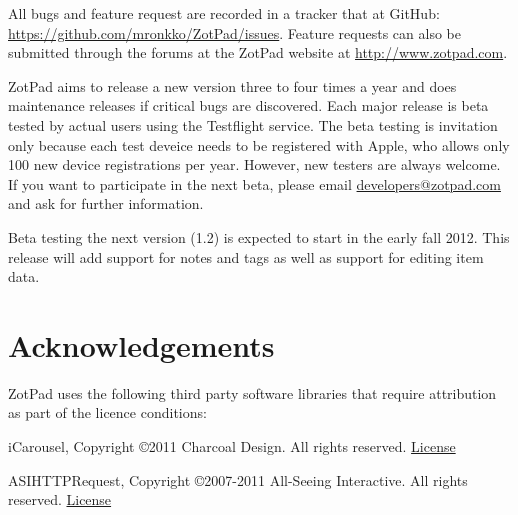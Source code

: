 \documentclass[oneside, openany, 12pt]{tufte-book}
\newcommand{\ipad}[1]{}
\newcommand{\ipad}[1]{#1}
\begin{document}
All bugs and feature request are recorded in a tracker that at GitHub: \url{https://github.com/mronkko/ZotPad/issues}. Feature requests can also be submitted through the forums at the ZotPad website at \url{http://www.zotpad.com}. 

ZotPad aims to release a new version three to four times a year and does maintenance releases if critical bugs are discovered. Each major release is beta tested by actual users using the Testflight service. The beta testing is invitation only because each test deveice needs to be registered with Apple, who allows only 100 new device registrations per year. However, new testers are always welcome. If you want to participate in the next beta, please email \href{mailto:developers@zotpad.com}{developers@zotpad.com} and ask for further information.

Beta testing the next version (1.2) is expected to start in the early fall 2012. This release will add support for notes and tags as well as support for editing item data. 

\chapter{Acknowledgements}

\ipad{\begin{fullwidth}}

\setlength{\parindent}{0pt}

\setlength{\parskip}{\baselineskip}

ZotPad uses the following third party software libraries that require attribution as part of the licence conditions:

iCarousel, Copyright \copyright 2011 Charcoal Design. All rights reserved. \href{https://raw.github.com/nicklockwood/iCarousel/104d499da7b107b8baa58ab85c6d0f44d504e957/LICENCE.md}{License}

ASIHTTPRequest, Copyright \copyright 2007-2011 All-Seeing Interactive. All rights reserved. \href{https://raw.github.com/pokeb/asi-http-request/3cb0230e547b0d13d88843ec7fc6ed77d69cb7c6/LICENSE}{License}
\end{document}
